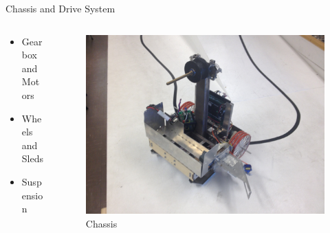 \documentclass[aspectratio=43]{beamer}
\begin{document}
  \begin{frame}{Chassis and Drive System}
    \begin{columns}[c]
      \begin{column}[c]{5cm}
        \begin{itemize}
          \item Gearbox and Motors
          \item Wheels and Sleds
          \item Suspension
        \end{itemize}
      \end{column}
      \begin{column}[c]{5cm}
        \begin{figure}[h]
          \centering
          \includegraphics[scale = 0.05, angle=180]{Chassis.JPG}
          \vspace{7pt}
          \large{Chassis}
        \end{figure}
      \end{column}
    \end{columns}
  \end{frame} 
  
\end{document}
